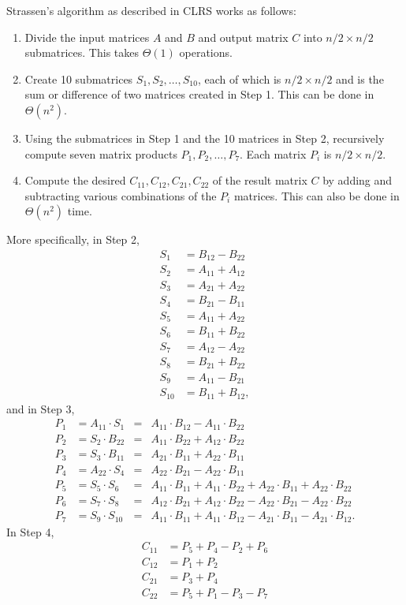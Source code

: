 Strassen's algorithm as described in CLRS works as follows:
\begin{enumerate}
    \item Divide the input matrices $A$ and $B$ and output matrix $C$ into $n/2 \times n/2$ submatrices. This takes $\Theta(1)$ operations.
    \item Create 10 submatrices $S_1,S_2,\ldots,S_{10}$, each of which is $n/2 \times n/2$ and is the sum or difference of two matrices created in Step 1. This can be done in $\Theta(n^2)$.
    \item Using the submatrices in Step 1 and the 10 matrices in Step 2, recursively compute seven matrix products $P_1,P_2,\ldots,P_7$. Each matrix $P_i$ is $n/2 \times n/2$.
    \item Compute the desired $C_{11},C_{12},C_{21},C_{22}$ of the result matrix $C$ by adding and subtracting various combinations of the $P_i$ matrices. This can also be done in $\Theta(n^2)$ time.
\end{enumerate}
More specifically, in Step 2,
$$
\begin{aligned}
    S_1 &= B_{12} - B_{22} \\
    S_2 &= A_{11} + A_{12} \\
    S_3 &= A_{21} + A_{22} \\
    S_4 &= B_{21} - B_{11} \\
    S_5 &= A_{11} + A_{22} \\
    S_6 &= B_{11} + B_{22} \\
    S_7 &= A_{12} - A_{22} \\
    S_8 &= B_{21} + B_{22} \\
    S_9 &= A_{11} - B_{21} \\
    S_{10} &= B_{11} + B_{12},
\end{aligned}
$$
and in Step 3,
$$
\begin{aligned}
    P_1 &= A_{11} \cdot S_1 &=& A_{11} \cdot B_{12} - A_{11} \cdot B_{22} \\
    P_2 &= S_2 \cdot B_{22} &=& A_{11} \cdot B_{22} + A_{12} \cdot B_{22} \\
    P_3 &= S_3 \cdot B_{11} &=& A_{21} \cdot B_{11} + A_{22} \cdot B_{11} \\
    P_4 &= A_{22} \cdot S_4 &=& A_{22} \cdot B_{21} - A_{22} \cdot B_{11} \\
    P_5 &= S_5 \cdot S_6 &=& A_{11} \cdot B_{11} + A_{11} \cdot B_{22} + A_{22} \cdot B_{11} + A_{22} \cdot B_{22} \\
    P_6 &= S_7 \cdot S_8 &=& A_{12} \cdot B_{21} + A_{12} \cdot B_{22} - A_{22} \cdot B_{21} - A_{22} \cdot B_{22} \\
    P_7 &= S_9 \cdot S_{10} &=& A_{11} \cdot B_{11} + A_{11} \cdot B_{12} - A_{21} \cdot B_{11} - A_{21} \cdot B_{12}.
\end{aligned}
$$
In Step 4,
$$
\begin{aligned}
    C_{11} &= P_5 + P_4 - P_2 + P_6 \\
    C_{12} &= P_1 + P_2 \\
    C_{21} &= P_3 + P_4 \\
    C_{22} &= P_5 + P_1 - P_3 - P_7
\end{aligned}
$$